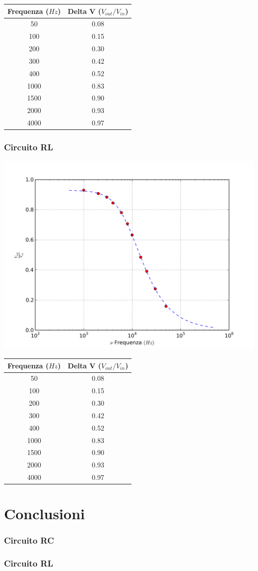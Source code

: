 \begin{center}
\begin{tabular}{*{2}{c}}
Frequenza ($Hz$) & Delta V ($V_{out}/V_{in}$) \\
\midrule
50 & 0.08 \\
100 & 0.15 \\
200 & 0.30 \\
300 & 0.42 \\
400 & 0.52 \\
1000 & 0.83 \\
1500 & 0.90 \\
2000 & 0.93 \\
4000 & 0.97 \\
\end{tabular}
\end{center}


\subsubsection{Circuito RL}

\begin{center}
 \includegraphics[scale=0.70]{grafici/C3/ddpindu.png}
\end{center}

\begin{center}
\begin{tabular}{*{2}{c}}
Frequenza ($Hz$) & Delta V ($V_{out}/V_{in}$) \\
\midrule
50 & 0.08 \\
100 & 0.15 \\
200 & 0.30 \\
300 & 0.42 \\
400 & 0.52 \\
1000 & 0.83 \\
1500 & 0.90 \\
2000 & 0.93 \\
4000 & 0.97 \\
\end{tabular}
\end{center}

\section{Conclusioni}
\subsubsection{Circuito RC}
\subsubsection{Circuito RL}
